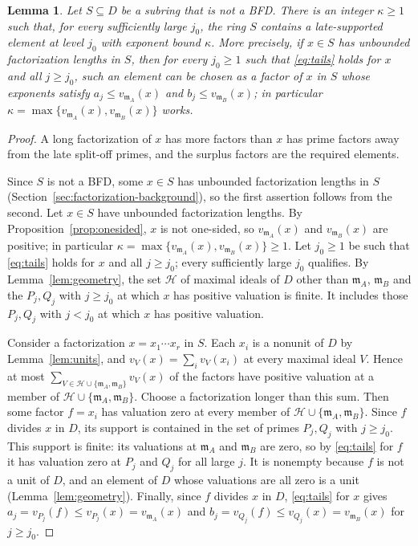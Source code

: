 \documentclass[11pt]{article}
\theoremstyle{plain}
\newtheorem{lemma}[theorem]{Lemma}
\theoremstyle{definition}
\theoremstyle{remark}
\newcommand{\EA}{\mathfrak m_A}
\newcommand{\EB}{\mathfrak m_B}
\begin{document}
\begin{lemma}\label{lem:extraction}
Let $S\subseteq D$ be a subring that is not a BFD.  There is an integer
$\kappa\geq1$ such that, for every sufficiently large $j_0$, the ring $S$
contains a late-supported element at level $j_0$ with exponent bound
$\kappa$.  More precisely, if $x\in S$ has unbounded factorization
lengths in $S$, then for every $j_0\geq1$ such that \eqref{eq:tails}
holds for $x$ and all $j\geq j_0$, such an element can be chosen as a
factor of $x$ in $S$
whose exponents satisfy $a_j\leq v_{\EA}(x)$ and $b_j\leq v_{\EB}(x)$; in
particular $\kappa=\max\{v_{\EA}(x),v_{\EB}(x)\}$ works.
\end{lemma}
\begin{proof}
A long factorization of $x$ has more factors than $x$ has prime factors
away from the late split-off primes, and the surplus factors are the
required elements.

Since $S$ is not a BFD, some $x\in S$ has unbounded factorization lengths
in $S$ (Section~\ref{sec:factorization-background}), so the first
assertion follows from the second.  Let $x\in S$ have unbounded
factorization lengths.  By Proposition~\ref{prop:onesided}, $x$ is not
one-sided, so $v_{\EA}(x)$ and $v_{\EB}(x)$ are positive; in particular
$\kappa=\max\{v_{\EA}(x),v_{\EB}(x)\}\geq1$.  Let $j_0\geq1$ be such that \eqref{eq:tails} holds
for $x$ and all $j\geq j_0$; every sufficiently large $j_0$ qualifies.  By
Lemma~\ref{lem:geometry}, the set $\mathcal H$ of maximal ideals of $D$
other than $\EA$, $\EB$ and the $P_j,Q_j$ with $j\geq j_0$ at which $x$
has positive valuation is finite.  It includes those $P_j,Q_j$ with
$j<j_0$ at which $x$ has positive valuation.

Consider a factorization $x=x_1\cdots x_r$ in $S$.  Each $x_i$ is a
nonunit of $D$ by Lemma~\ref{lem:units}, and $v_V(x)=\sum_iv_V(x_i)$ at
every maximal ideal $V$.  Hence at most
$\sum_{V\in\mathcal H\cup\{\EA,\EB\}}v_V(x)$ of the factors have positive
valuation at a member of $\mathcal H\cup\{\EA,\EB\}$.  Choose a
factorization longer than this sum.  Then some factor $f=x_i$ has
valuation zero at every member of $\mathcal H\cup\{\EA,\EB\}$.  Since $f$
divides $x$ in $D$, its support is contained in the set of primes
$P_j,Q_j$ with $j\geq j_0$.  This support is finite: its valuations at
$\EA$ and $\EB$ are zero, so by \eqref{eq:tails} for $f$ it has valuation
zero at $P_j$ and $Q_j$ for all large $j$.  It is nonempty because $f$ is
not a unit of $D$, and an element of $D$ whose valuations are all zero is
a unit (Lemma~\ref{lem:geometry}).  Finally, since $f$ divides
$x$ in $D$, \eqref{eq:tails} for $x$ gives
$a_j=v_{P_j}(f)\leq v_{P_j}(x)=v_{\EA}(x)$ and
$b_j=v_{Q_j}(f)\leq v_{Q_j}(x)=v_{\EB}(x)$ for $j\geq j_0$.
\end{proof}
\end{document}
